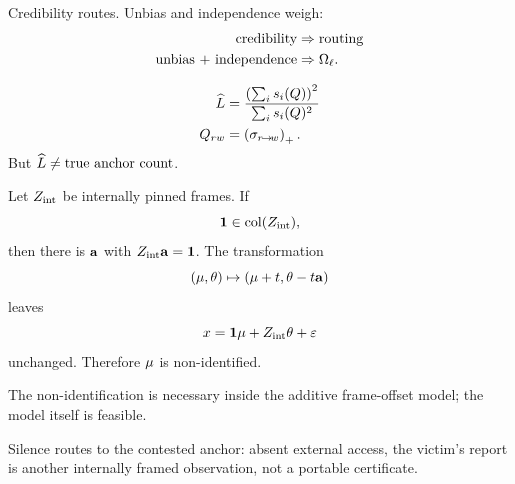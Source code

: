\documentclass[../main]{subfiles}
\begin{document}
\begin{insight}
  Credibility routes. Unbias and independence weigh:
  \begin{align}
    \text{credibility} &\Rightarrow \text{routing}
      \label{eq:recov:split-cred}\\
    \text{unbias + independence} &\Rightarrow \Omega\sb{\ell}.
      \label{eq:recov:split-unbias}
  \end{align}
\end{insight}

\begin{remark}
  \begin{align}
    \widehat{L}
      &=\frac{\left(\sum_i s_i(Q)\right)^2}{\sum_i s_i(Q)^2}
      \label{eq:recov:lhat}\\
    Q_{rw} &=\left(\sigma\sb{ r\!\to\!w }\right)\sb{+}.
      \label{eq:recov:Q}
  \end{align}
  But $\widehat{L}\neq\text{true anchor count}$.
\end{remark}

\begin{theorem}
  Let $Z\sb{\mathrm{int}}$ be internally pinned frames. If
  \begin{equation}
    \mathbf 1\in\operatorname{col}(Z\sb{\mathrm{int}}),
    \label{eq:recov:covering}
  \end{equation}
  then there is $\mathbf{a}$ with $Z\sb{\mathrm{int}}\mathbf{a}=\mathbf 1$. The transformation
  \begin{equation}
    (\mu,\theta)
    \mapsto
    (\mu+t,\theta-t\mathbf{a})
    \label{eq:recov:reparam}
  \end{equation}
  leaves
  \begin{equation}
    x=\mathbf 1\mu+Z\sb{\mathrm{int}}\theta+\varepsilon
    \label{eq:recov:invariant}
  \end{equation}
  unchanged. Therefore $\mu$ is non-identified.
\end{theorem}

\begin{remark}
  The non-identification is necessary inside the additive frame-offset model; the model
  itself is feasible.
\end{remark}

\begin{insight}
  Silence routes to the contested anchor: absent external access, the victim's report is
  another internally framed observation, not a portable certificate.
\end{insight}
\end{document}
